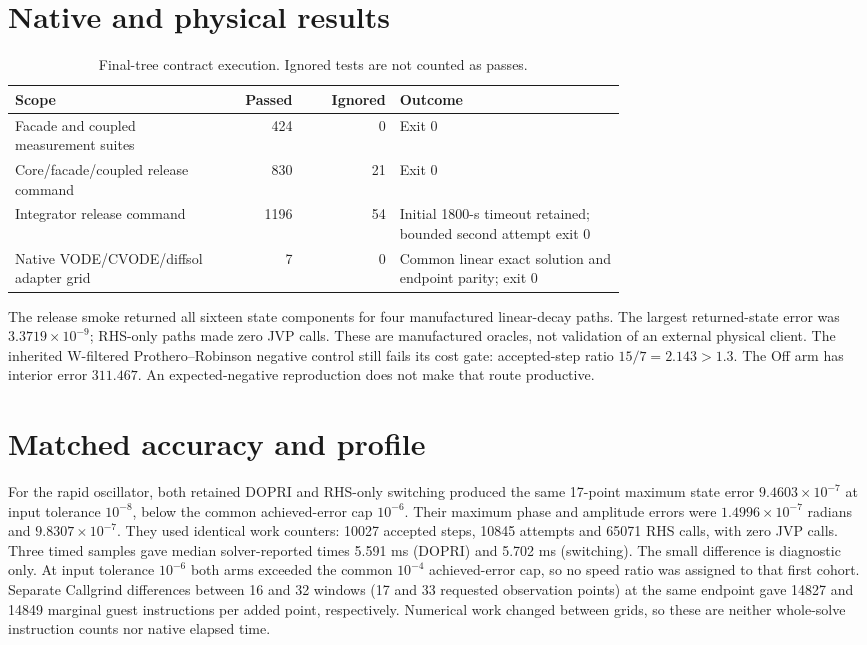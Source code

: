 \documentclass[aps,pra,reprint,onecolumn,10pt,notitlepage,nofootinbib]{revtex4-2}
\begin{document}
\section{Native and physical results}
\begin{table}[h]
\caption{Final-tree contract execution. Ignored tests are not counted as passes.}
\begin{tabular}{L{0.34\linewidth}rrL{0.37\linewidth}}
\toprule
Scope & Passed & Ignored & Outcome\\
\midrule
Facade and coupled measurement suites & 424 & 0 & Exit 0\\
Core/facade/coupled release command & 830 & 21 & Exit 0\\
Integrator release command & 1196 & 54 & Initial 1800-s timeout retained; bounded second attempt exit 0\\
Native VODE/CVODE/diffsol adapter grid & 7 & 0 & Common linear exact solution and endpoint parity; exit 0\\
\bottomrule
\end{tabular}
\end{table}

The release smoke returned all sixteen state components for four manufactured
linear-decay paths. The largest returned-state error was
$3.3719\times 10^{-9}$; RHS-only paths made zero JVP calls. These are
manufactured oracles, not validation of an external physical client.
The inherited W-filtered Prothero--Robinson negative control still fails its
cost gate: accepted-step ratio $15/7=2.143>1.3$. The Off arm has interior
error $311.467$. An expected-negative reproduction does not make that route
productive.

\section{Matched accuracy and profile}
For the rapid oscillator, both retained DOPRI and RHS-only switching produced
the same 17-point maximum state error $9.4603\times10^{-7}$ at input tolerance
$10^{-8}$, below the common achieved-error cap $10^{-6}$. Their maximum
phase and amplitude errors were $1.4996\times10^{-7}$ radians and
$9.8307\times10^{-7}$. They used identical work counters: 10027 accepted
steps, 10845 attempts and 65071 RHS calls, with zero JVP calls. Three timed
samples gave median solver-reported times 5.591 ms (DOPRI) and 5.702 ms
(switching). The small difference is diagnostic only. At input tolerance
$10^{-6}$ both arms exceeded the common $10^{-4}$ achieved-error cap, so no
speed ratio was assigned to that first cohort. Separate Callgrind differences between 16 and 32 windows (17 and 33 requested observation points)
at the same endpoint gave 14827 and 14849 marginal guest instructions
per added point, respectively. Numerical work changed between grids, so these
are neither whole-solve instruction counts nor native elapsed time.
\end{document}
